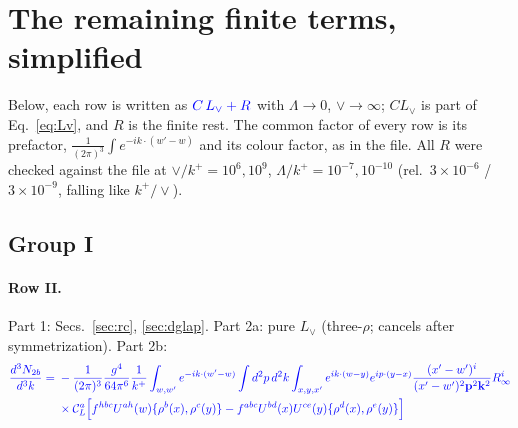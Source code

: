 \documentclass[10pt]{article}
\numberwithin{equation}{section}
\newcommand{\new}[1]{{\color{blue}#1}}
\newcommand{\Lv}{L_{\vee}}
\newcommand{\CL}{\mathcal C_L}
\newcommand{\pre}{\frac{1}{(2\pi)^3}}
\newcommand{\phw}{e^{-ik\cdot(w'-w)}}
\begin{document}
\section{The remaining finite terms, simplified}\label{sec:simp}
Below, each row is written as $\new{C\,\Lv+R}$ with $\Lambda\to0$, $\vee\to\infty$; $C\Lv$ is part of Eq.~\eqref{eq:Lv}, and $R$ is the finite rest. The common factor of every row is its prefactor, $\pre\int\phw$ and its colour factor, as in the file. All $R$ were checked against the file at $\vee/k^+=10^6,10^9$, $\Lambda/k^+=10^{-7},10^{-10}$ (rel.\ $3\times10^{-6}$ / $3\times10^{-9}$, falling like $k^+/\vee$).

\subsection{Group I}
\paragraph{Row II.} Part 1: Secs.~\ref{sec:rc}, \ref{sec:dglap}. Part 2a: pure $\Lv$ (three-$\rho$; cancels after symmetrization). Part 2b:
\begin{equation*}
\new{\begin{aligned}\frac{d^3N_{2b}}{d^3k}={}&-\pre\frac{g^4}{64\pi^6}\frac{1}{k^+}\int_{w,w'}\phw\int d^2p\,d^2k\int_{x,y,x'}e^{ik\cdot(w-y)}e^{ip\cdot(y-x)}\frac{(x'-w')^i}{(x'-w')^2\mathbf p^2\mathbf k^2}R^i_\infty\\&\times\CL^a\Big[f^{hbc}U^{ah}(w)\{\rho^b(x),\rho^c(y)\}-f^{abc}U^{bd}(x)U^{ce}(y)\{\rho^d(x),\rho^e(y)\}\Big]\end{aligned}}
\end{equation*}
\end{document}
